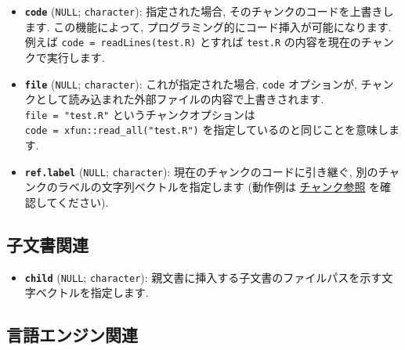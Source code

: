 \documentclass[
  lualatex,ja=standard,jafont=noto-otf]{bxjsreport}
\providecommand{\tightlist}{%
  \setlength{\itemsep}{0pt}\setlength{\parskip}{0pt}}
\begin{document}
\begin{itemize}
\tightlist
\item
  \textbf{\texttt{code}} (\texttt{NULL}; \texttt{character}):
  指定された場合, そのチャンクのコードを上書きします. この機能によって,
  プログラミング的にコード挿入が可能になります. 例えば
  \texttt{code\ =\ readLines(\textquotesingle{}test.R\textquotesingle{})}
  とすれば \texttt{test.R} の内容を現在のチャンクで実行します.
\item
  \textbf{\texttt{file}} (\texttt{NULL}; \texttt{character}):
  これが指定された場合, \texttt{code} オプションが,
  チャンクとして読み込まれた外部ファイルの内容で上書きされます.
  \texttt{file\ =\ "test.R"} というチャンクオプションは
  \texttt{code\ =\ xfun::read\_all("test.R")}
  を指定しているのと同じことを意味します.
\item
  \textbf{\texttt{ref.label}} (\texttt{NULL}; \texttt{character}):
  現在のチャンクのコードに引き継ぐ,
  別のチャンクのラベルの文字列ベクトルを指定します (動作例は
  \protect\hyperlink{reference}{チャンク参照} を確認してください).
\end{itemize}

\hypertarget{child-document}{%
\subsection{子文書関連}\label{child-document}}

\begin{itemize}
\tightlist
\item
  \textbf{\texttt{child}} (\texttt{NULL}; \texttt{character}):
  親文書に挿入する子文書のファイルパスを示す文字ベクトルを指定します.
\end{itemize}

\hypertarget{engine}{%
\subsection{言語エンジン関連}\label{engine}}
\end{document}
